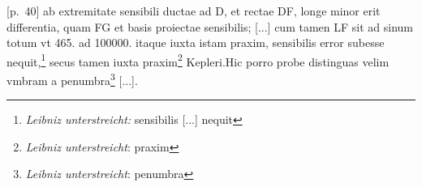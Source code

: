[p.~40] ab extremitate sensibili ductae ad D, et rectae DF, longe minor erit differentia, quam FG et basis proiectae sensibilis; [...] cum tamen LF sit ad sinum totum vt 465. ad 100000. itaque iuxta istam praxim, sensibilis error subesse nequit,\footnote{\textit{Leibniz unterstreicht:} sensibilis [...] nequit} secus tamen iuxta praxim\footnote{\textit{Leibniz unterstreicht}: praxim} Kepleri\protect{}.\pend \pstart [...] Hic porro probe distinguas velim vmbram a penumbra\footnote{\textit{Leibniz unterstreicht}: penumbra} [...].\pend \pstart